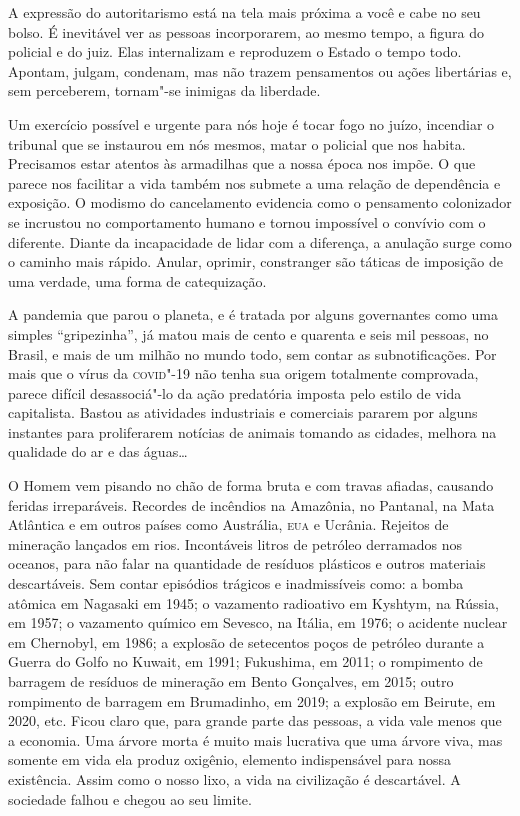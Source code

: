A expressão do autoritarismo está na tela mais próxima a você e cabe no
seu bolso. É inevitável ver as pessoas incorporarem, ao mesmo tempo, a
figura do policial e do juiz. Elas internalizam e reproduzem o Estado o
tempo todo. Apontam, julgam, condenam, mas não trazem pensamentos ou
ações libertárias e, sem perceberem, tornam"-se inimigas da liberdade.

Um exercício possível e urgente para nós hoje é tocar fogo no juízo,
incendiar o tribunal que se instaurou em nós mesmos, matar o policial
que nos habita. Precisamos estar atentos às armadilhas que a nossa época
nos impõe. O que parece nos facilitar a vida também nos submete a uma
relação de dependência e exposição. O modismo do cancelamento evidencia
como o pensamento colonizador se incrustou no comportamento humano e
tornou impossível o convívio com o diferente. Diante da incapacidade de
lidar com a diferença, a anulação surge como o caminho mais rápido.
Anular, oprimir, constranger são táticas de imposição de uma verdade,
uma forma de catequização.

A pandemia que parou o planeta, e é tratada por alguns governantes como
uma simples ``gripezinha'', já matou mais de cento e quarenta e seis mil
pessoas, no Brasil, e mais de um milhão no mundo todo, sem contar as
subnotificações. Por mais que o vírus da \textsc{covid}"-19 não tenha sua origem
totalmente comprovada, parece difícil desassociá"-lo da ação predatória
imposta pelo estilo de vida capitalista. Bastou as atividades
industriais e comerciais pararem por alguns instantes para proliferarem
notícias de animais tomando as cidades, melhora na qualidade do ar e das
águas\ldots{}

O Homem vem pisando no chão de forma bruta e com travas afiadas,
causando feridas irreparáveis. Recordes de incêndios na Amazônia, no
Pantanal, na Mata Atlântica e em outros países como Austrália, \textsc{eua} e
Ucrânia. Rejeitos de mineração lançados em rios. Incontáveis litros de
petróleo derramados nos oceanos, para não falar na quantidade de
resíduos plásticos e outros materiais descartáveis. Sem contar episódios
trágicos e inadmissíveis como: a bomba atômica em Nagasaki em 1945; o
vazamento radioativo em Kyshtym, na Rússia, em 1957; o vazamento químico
em Sevesco, na Itália, em 1976; o acidente nuclear em Chernobyl, em
1986; a explosão de setecentos poços de petróleo durante a Guerra do
Golfo no Kuwait, em 1991; Fukushima, em 2011; o rompimento de barragem
de resíduos de mineração em Bento Gonçalves, em 2015; outro rompimento
de barragem em Brumadinho, em 2019; a explosão em Beirute, em 2020, etc.
Ficou claro que, para grande parte das pessoas, a vida vale menos que a
economia. Uma árvore morta é muito mais lucrativa que uma árvore viva,
mas somente em vida ela produz oxigênio, elemento indispensável para
nossa existência. Assim como o nosso lixo, a vida na civilização é
descartável. A sociedade falhou e chegou ao seu limite.

